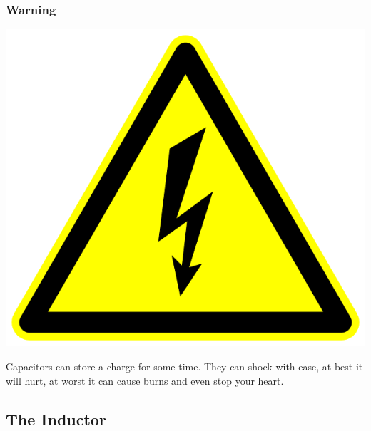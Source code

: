 \documentclass[10pt, handout]{beamer}
\begin{document}
\begin{frame}
\frametitle{Warning}
\begin{center}
\includegraphics[height=.5\textheight]{shockhazard.png}
\end{center}
Capacitors can store a charge for some time. They can shock with ease, at best it will hurt, at worst it can cause burns and even stop your heart.
\end{frame}

\subsection{The Inductor}
\end{document}
